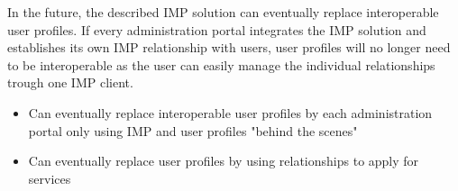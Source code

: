 In the future, the described IMP solution can eventually replace interoperable user profiles. If every administration portal integrates the IMP solution and establishes its own IMP relationship with users, user profiles will no longer need to be interoperable as the user can easily manage the individual relationships trough one IMP client.

\begin{itemize}
    \item Can eventually replace interoperable user profiles by each administration portal only using IMP and user profiles "behind the scenes"
    \item Can eventually replace user profiles by using relationships to apply for services
\end{itemize}